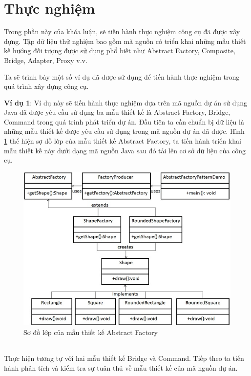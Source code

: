 \documentclass[12pt]{report}
\begin{document}
\section{Thực nghiệm}
Trong phần này của khóa luận, sẽ tiến hành thực nghiệm công cụ đã được xây dựng. Tập dữ liệu thử nghiệm bao gồm mã nguồn có triển khai những mẫu thiết kế hướng đối tượng được sử dụng phổ biết như Abstract Factory, Composite, Bridge, Adapter, Proxy v.v.

\noindent Ta sẽ trình bày một số ví dụ đã được sử dụng để tiến hành thực nghiệm trong quá trình xây dựng công cụ.

\noindent \textbf{Ví dụ 1}: Ví dụ này sẽ tiến hành thực nghiệm dựa trên mã nguồn dự án sử dụng Java đã được yêu cầu sử dụng ba mẫu thiết kế là Abstract Factory, Bridge, Command trong quá trình phát triển dự án.
Đầu tiên ta cần chuẩn bị dữ liệu là những mẫu thiết kế được yêu cầu sử dụng trong mã nguồn dự án đã được. Hình 
\ref{fig:class_diagram_abstract_factory} thể hiện sợ đồ lớp của mẫu thiết kế Abstract Factory, ta tiến hành triển khai mẫu thiết kế này dưới dạng mã nguồn Java sau đó tải lên cơ sở dữ liệu của công cụ.
\begin{figure}[h]
	\centering
	\includegraphics[scale=1]{images/abstract_factory}
	\caption{Sơ đồ lớp của mẫu thiết kế Abstract Factory}
	\label{fig:class_diagram_abstract_factory}
\end{figure}\\
Thực hiện tương tự với hai mẫu thiết kế Bridge và Command. Tiếp theo ta tiến hành phân tích và kiểm tra sự tuân thủ về mẫu thiết kế của mã nguồn dự án. 
\end{document}

